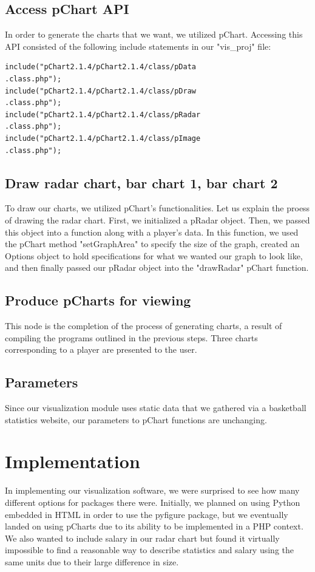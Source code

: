 \documentclass[journal]{vgtc}                %
\begin{document}
\subsection{Access pChart API}
In order to generate the charts that we want, we utilized pChart. Accessing this API consisted of the following include statements in our "vis\_proj" file:
\begin{lstlisting}
include("pChart2.1.4/pChart2.1.4/class/pData
.class.php");
include("pChart2.1.4/pChart2.1.4/class/pDraw
.class.php");
include("pChart2.1.4/pChart2.1.4/class/pRadar
.class.php");
include("pChart2.1.4/pChart2.1.4/class/pImage
.class.php");
\end{lstlisting}
\subsection{Draw radar chart, bar chart 1, bar chart 2}
To draw our charts, we utilized pChart's functionalities. Let us explain the proess of drawing the radar chart. First, we initialized a pRadar object. Then, we passed this object into a function along with a player's data. In this function, we used the pChart method "setGraphArea" to specify the size of the graph, created an Options object to hold specifications for what we wanted our graph to look like, and then finally passed our pRadar object into the "drawRadar" pChart function.
\subsection{Produce pCharts for viewing}
This node is the completion of the process of generating charts, a result of compiling the programs outlined in the previous steps. Three charts corresponding to a player are presented to the user.
\subsection{Parameters}
Since our visualization module uses static data that we gathered via a basketball statistics website, our parameters to pChart functions are unchanging. 
\section{Implementation}
In implementing our visualization software, we were surprised to see how many different options for packages there were. Initially, we planned on using Python embedded in HTML in order to use the pyfigure package, but we eventually landed on using pCharts due to its ability to be implemented in a PHP context. We also wanted to include salary in our radar chart but found it virtually impossible to find a reasonable way to describe statistics and salary using the same units due to their large difference in size. 
\end{document}
